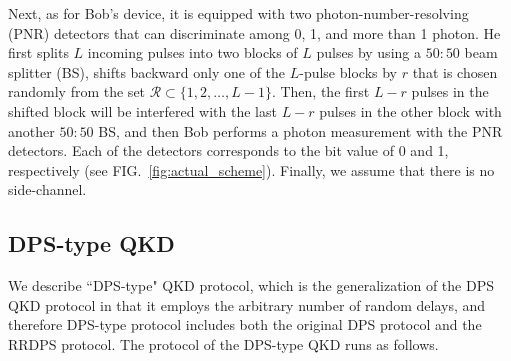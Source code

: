 \documentclass[twocolumn,superscriptaddress,pra,footinbib,notitlepage]{revtex4-1}
\newcommand{\1}{\mbox{1}\hspace{-0.25em}\mbox{l}}
\begin{document}
Next, as for Bob's device, it is equipped with two photon-number-resolving (PNR) detectors that can discriminate among 0, 1, and more than 1 photon.
He first splits $L$ incoming pulses into two blocks of $L$ pulses by using a $50:50$ beam splitter (BS), shifts backward only one of the $L$-pulse blocks by $r$ that is chosen randomly from the set $\mathcal{R}\subset\{1, 2, \dots, L-1\}$.
Then, the first $L-r$ pulses in the shifted block will be interfered with the last $L-r$ pulses in the other block with another $50:50$ BS, and then Bob performs a photon measurement with the PNR detectors.
Each of the detectors corresponds to the bit value of 0 and 1, respectively (see FIG.~\ref{fig:actual_scheme}).
Finally, we assume that there is no side-channel.
%
\subsection{DPS-type QKD}
We describe ``DPS-type" QKD protocol, which is the generalization of the DPS QKD protocol in that it employs the arbitrary number of random delays, and therefore DPS-type protocol includes both the original DPS protocol and the RRDPS protocol.
The protocol of the DPS-type QKD runs as follows.
%
\end{document}
